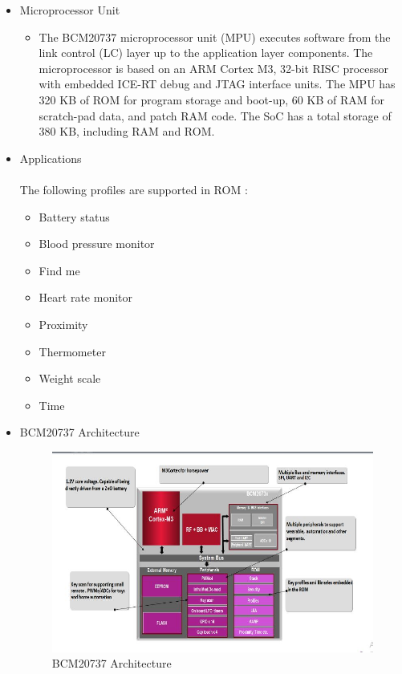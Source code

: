 \documentclass[11pt,a4paper]{article}
\begin{document}
\begin{itemize}
\item Microprocessor Unit
\begin{itemize}
\item The BCM20737 microprocessor unit (MPU) executes software from the link control (LC) layer up to the
application layer components. The microprocessor is based on an ARM Cortex M3, 32-bit RISC processor with embedded ICE-RT debug and JTAG interface units. The MPU has 320 KB of ROM for program storage and
boot-up, 60 KB of RAM for scratch-pad data, and patch RAM code. The SoC has a total storage of 380 KB,
including RAM and ROM.
\end{itemize}

\item Applications
\\ \\
The following profiles are supported in ROM :
\begin{itemize}
\item  Battery status
\item Blood pressure monitor
\item Find me
\item Heart rate monitor
\item Proximity
\item Thermometer
\item Weight scale
\item Time
\end{itemize}

\newpage
\item BCM20737 Architecture
\begin{figure}[h]
    \centering
	\includegraphics[scale=0.8]{architecture.JPG}
	\caption {BCM20737 Architecture}
	\end{figure}
	

\end{itemize}
\end{document}
